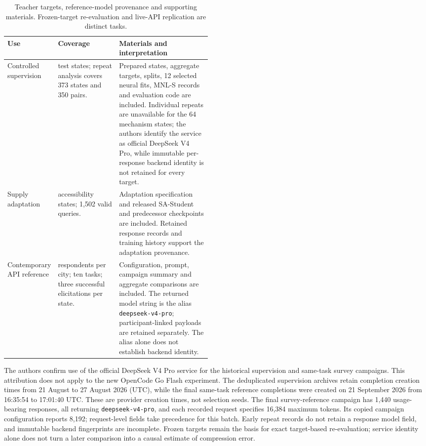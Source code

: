 \begin{table}[pos=htbp]
\centering\small
\caption{Teacher targets, reference-model provenance and supporting materials. Frozen-target re-evaluation and live-API replication are distinct tasks.}
\label{tab:teacher_materials}
\renewcommand{\arraystretch}{1.13}
\begin{tabularx}{\linewidth}{@{}>{\raggedright\arraybackslash}p{0.18\linewidth}>{\raggedright\arraybackslash}p{0.30\linewidth}>{\raggedright\arraybackslash}X@{}}
\toprule
Use & Coverage & Materials and interpretation \\
\midrule
Controlled supervision & 437 test states; repeat analysis covers 373 states and 350 pairs. & Prepared states, aggregate targets, splits, 12 selected neural fits, MNL-S records and evaluation code are included. Individual repeats are unavailable for the 64 mechanism states; the authors identify the service as official DeepSeek V4 Pro, while immutable per-response backend identity is not retained for every target. \\
Supply adaptation & 336 accessibility states; 1,502 valid queries. & Adaptation specification and released SA-Student and predecessor checkpoints are included. Retained response records and training history support the adaptation provenance. \\
Contemporary API reference & 24 respondents per city; ten tasks; three successful elicitations per state. & Configuration, prompt, campaign summary and aggregate comparisons are included. The returned model string is the alias \texttt{deepseek-v4-pro}; participant-linked payloads are retained separately. The alias alone does not establish backend identity. \\
\bottomrule
\end{tabularx}
\end{table}

The authors confirm use of the official DeepSeek V4 Pro service for the historical supervision and same-task survey campaigns. This attribution does not apply to the new OpenCode Go Flash experiment. The deduplicated supervision archives retain completion creation times from 21 August to 27 August 2026 (UTC), while the final same-task reference completions were created on 21 September 2026 from 16:35:54 to 17:01:40 UTC. These are provider creation times, not selection seeds. The final survey-reference campaign has 1,440 usage-bearing responses, all returning \texttt{deepseek-v4-pro}, and each recorded request specifies 16,384 maximum tokens. Its copied campaign configuration reports 8,192; request-level fields take precedence for this batch. Early repeat records do not retain a response model field, and immutable backend fingerprints are incomplete. Frozen targets remain the basis for exact target-based re-evaluation; service identity alone does not turn a later comparison into a causal estimate of compression error.

